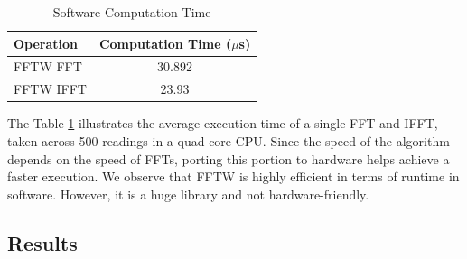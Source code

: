 \begin{table}[htbp]
\caption{Software Computation Time}
\centering
\begin{tabular}{l c}
\toprule
\textbf{Operation} & \textbf{Computation Time ($\mu$s)}\\
\midrule
FFTW FFT &30.892\\
\midrule
FFTW IFFT &23.93\\
\bottomrule
\end{tabular}
\label{table:fft_time}
\end{table}
The Table \ref{table:fft_time} illustrates the average execution time of a single FFT and IFFT, taken across 500 readings in a quad-core CPU. Since the speed of the algorithm depends on the speed of FFTs, porting this portion to hardware helps achieve a faster execution. We observe that FFTW is highly efficient in terms of runtime in software. However, it is a huge library and not hardware-friendly. \newline \newline
\subsection{Results}
\label{4_1_2}
